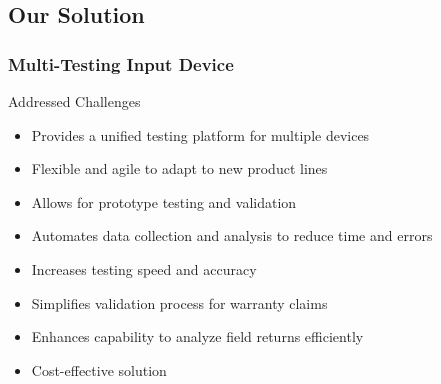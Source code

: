 \documentclass[8pt,compress,aspectratio=169]{beamer}
\begin{document}
\subsection{Our Solution}
\begin{frame}
    \frametitle{Multi-Testing Input Device}
    \begin{block}{Addressed Challenges}
        \begin{itemize}
            \item Provides a unified testing platform for multiple devices
            \item Flexible and agile to adapt to new product lines
            \item Allows for prototype testing and validation
            \item Automates data collection and analysis to reduce time and errors
            \item Increases testing speed and accuracy
            \item Simplifies validation process for warranty claims
            \item Enhances capability to analyze field returns efficiently
            \item Cost-effective solution
        \end{itemize}
    \end{block}
\end{frame}
\end{document}
